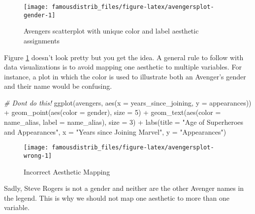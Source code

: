 \documentclass[
]{article}
\newenvironment{Shaded}{\begin{snugshade}}{\end{snugshade}}
\newcommand{\AttributeTok}[1]{\textcolor[rgb]{0.77,0.63,0.00}{#1}}
\newcommand{\CommentTok}[1]{\textcolor[rgb]{0.56,0.35,0.01}{\textit{#1}}}
\newcommand{\DecValTok}[1]{\textcolor[rgb]{0.00,0.00,0.81}{#1}}
\newcommand{\FunctionTok}[1]{\textcolor[rgb]{0.00,0.00,0.00}{#1}}
\newcommand{\NormalTok}[1]{#1}
\newcommand{\SpecialCharTok}[1]{\textcolor[rgb]{0.00,0.00,0.00}{#1}}
\newcommand{\StringTok}[1]{\textcolor[rgb]{0.31,0.60,0.02}{#1}}
\begin{document}
\begin{figure}

{\centering \texttt{[image: famousdistrib\_files/figure-latex/avengersplot-gender-1]} 

}

\caption{Avengers scatterplot with unique color and label aesthetic assignments}\label{fig:avengersplot-gender}
\end{figure}

Figure \ref{fig:avengersplot-gender} doesn't look pretty but you get the idea. A general rule to follow with data visualizations is to avoid mapping one aesthetic to multiple variables. For instance, a plot in which the color is used to illustrate both an Avenger's gender and their name would be confusing.

\begin{Shaded}
\begin{Highlighting}[]
\CommentTok{\# Don\textquotesingle{}t do this!}
\FunctionTok{ggplot}\NormalTok{(avengers, }\FunctionTok{aes}\NormalTok{(}\AttributeTok{x =}\NormalTok{ years\_since\_joining, }\AttributeTok{y =}\NormalTok{ appearances)) }\SpecialCharTok{+}
  \FunctionTok{geom\_point}\NormalTok{(}\FunctionTok{aes}\NormalTok{(}\AttributeTok{color =}\NormalTok{ gender), }\AttributeTok{size =} \DecValTok{5}\NormalTok{) }\SpecialCharTok{+}
  \FunctionTok{geom\_text}\NormalTok{(}\FunctionTok{aes}\NormalTok{(}\AttributeTok{color =}\NormalTok{ name\_alias, }\AttributeTok{label =}\NormalTok{ name\_alias), }\AttributeTok{size =} \DecValTok{3}\NormalTok{) }\SpecialCharTok{+}
  \FunctionTok{labs}\NormalTok{(}\AttributeTok{title =} \StringTok{"\textquotesingle{}Age\textquotesingle{} of Superheroes and Appearances"}\NormalTok{,}
       \AttributeTok{x =} \StringTok{"Years since Joining Marvel"}\NormalTok{,}
       \AttributeTok{y =} \StringTok{"Appearances"}\NormalTok{)}
\end{Highlighting}
\end{Shaded}

\begin{figure}

{\centering \texttt{[image: famousdistrib\_files/figure-latex/avengersplot-wrong-1]} 

}

\caption{Incorrect Aesthetic Mapping}\label{fig:avengersplot-wrong}
\end{figure}

Sadly, Steve Rogers is not a gender and neither are the other Avenger names in the legend. This is why we should not map one aesthetic to more than one variable.
\end{document}

